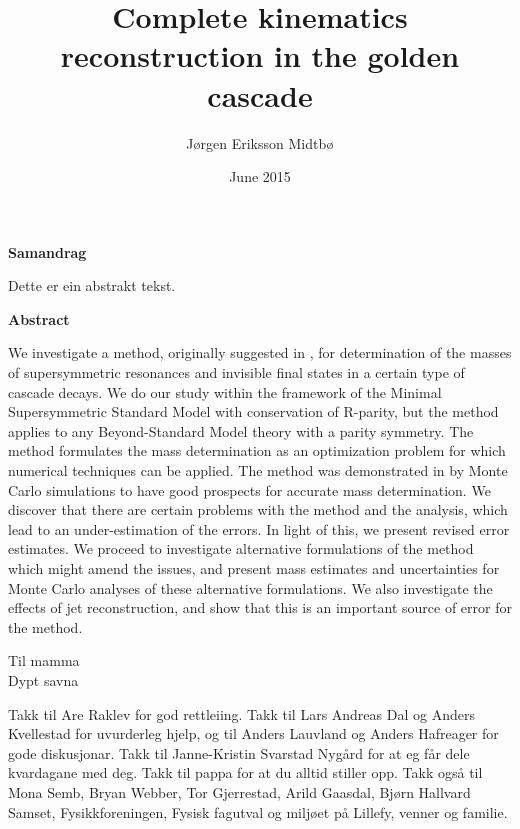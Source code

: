 \documentclass[twoside,english]{uiofysmaster}
\author{J\o rgen Eriksson Midtb\o}
\title{Complete kinematics reconstruction in the golden cascade}
\date{June 2015}
\newenvironment{abstractpage}
  {\cleardoublepage\vspace*{\fill}\thispagestyle{empty}}
  {\vfill\cleardoublepage}
\renewenvironment{abstract}[1]
  {\bigskip\selectlanguage{#1}%
   }
  {\par\bigskip}
\begin{document}

\cleardoublepage

\begin{abstractpage}

\begin{center}
	\textbf{Samandrag}
\end{center}
\begin{abstract}{norsk}
    Dette er ein abstrakt tekst.
\end{abstract}

\begin{center}
	\textbf{Abstract}
\end{center}
\begin{abstract}{english}
    We investigate a method, originally suggested in \cite{Webber:2009vm}, for determination of the masses of supersymmetric resonances and invisible final states in a certain type of cascade decays. We do our study within the framework of the Minimal Supersymmetric Standard Model with conservation of R-parity, but the method applies to any Beyond-Standard Model theory with a parity symmetry. The method formulates the mass determination as an optimization problem for which numerical techniques can be applied. The method was demonstrated in \cite{Webber:2009vm} by Monte Carlo simulations to have good prospects for accurate mass determination. We discover that there are certain problems with the method and the analysis, which lead to an under-estimation of the errors. In light of this, we present revised error estimates. We proceed to investigate alternative formulations of the method which might amend the issues, and present mass estimates and uncertainties for Monte Carlo analyses of these alternative formulations. We also investigate the effects of jet reconstruction, and show that this is an important source of error for the method. 
\end{abstract}

\end{abstractpage}


\begin{dedication}
Til mamma
 \\\vspace{12pt}
Dypt savna
\end{dedication}

\begin{acknowledgements}
Takk til Are Raklev for god rettleiing. Takk til Lars Andreas Dal og Anders Kvellestad for uvurderleg hjelp, og til Anders Lauvland og Anders Hafreager for gode diskusjonar. Takk til Janne-Kristin Svarstad Nyg{\aa}rd for at eg f{\aa}r dele kvardagane med deg. Takk til pappa for at du alltid stiller opp. Takk også til Mona Semb, Bryan Webber, Tor Gjerrestad, Arild Gaasdal, Bj{\o}rn Hallvard Samset, Fysikkforeningen, Fysisk fagutval og milj{\o}et p{\aa} Lillefy, venner og familie. 
\end{acknowledgements}
\end{document}
